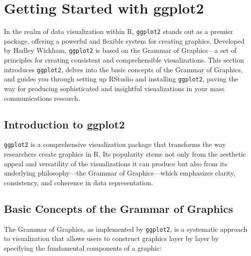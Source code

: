 \documentclass[
]{book}
\begin{document}
\hypertarget{getting-started-with-ggplot2}{%
\section{Getting Started with ggplot2}\label{getting-started-with-ggplot2}}

In the realm of data visualization within R, \texttt{ggplot2} stands out as a premier package, offering a powerful and flexible system for creating graphics. Developed by Hadley Wickham, \texttt{ggplot2} is based on the Grammar of Graphics---a set of principles for creating consistent and comprehensible visualizations. This section introduces \texttt{ggplot2}, delves into the basic concepts of the Grammar of Graphics, and guides you through setting up RStudio and installing \texttt{ggplot2}, paving the way for producing sophisticated and insightful visualizations in your mass communications research.

\hypertarget{introduction-to-ggplot2}{%
\subsection{Introduction to ggplot2}\label{introduction-to-ggplot2}}

\texttt{ggplot2} is a comprehensive visualization package that transforms the way researchers create graphics in R. Its popularity stems not only from the aesthetic appeal and versatility of the visualizations it can produce but also from its underlying philosophy---the Grammar of Graphics---which emphasizes clarity, consistency, and coherence in data representation.

\hypertarget{basic-concepts-of-the-grammar-of-graphics}{%
\subsection{Basic Concepts of the Grammar of Graphics}\label{basic-concepts-of-the-grammar-of-graphics}}

The Grammar of Graphics, as implemented by \texttt{ggplot2}, is a systematic approach to visualization that allows users to construct graphics layer by layer by specifying the fundamental components of a graphic:
\end{document}
